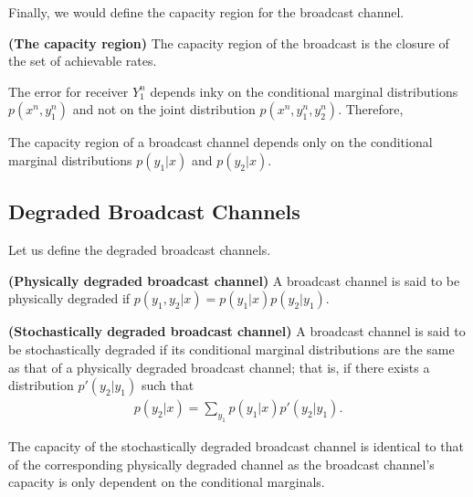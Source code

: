%
Finally, we would define the capacity region for the broadcast channel.
%
\begin{tcolorbox}[boxrule=0pt,frame hidden,sharp corners,enhanced, opacityback=0, borderline west={2pt}{0pt}{red}]
\begin{defn} \textbf{(The capacity region)} The capacity region of the broadcast is the closure of the set of achievable rates.
\end{defn}
\end{tcolorbox}
%
The error for receiver $Y_1^n$ depends inky on the conditional marginal distributions $p(x^n, y_1^n)$ and not on the joint distribution $p(x^n, y_1^n, y_2^n)$. Therefore,
%
\begin{tcolorbox}[boxrule=0pt,frame hidden,sharp corners,enhanced, opacityback=0, borderline west={2pt}{0pt}{blue}]
\begin{thm} 
The capacity region of a broadcast channel depends only on the conditional marginal distributions $p(y_1|x)$ and $p(y_2|x)$.
%
\end{thm}
\end{tcolorbox}
%
\subsection{Degraded Broadcast Channels}
Let us define the degraded broadcast channels.
%
\begin{tcolorbox}[boxrule=0pt,frame hidden,sharp corners,enhanced, opacityback=0, borderline west={2pt}{0pt}{red}]
\begin{defn} \textbf{(Physically degraded broadcast channel)} A broadcast channel is said to be physically degraded if $p(y_1,y_2|x) = p(y_1|x)p(y_2|y_1)$.
\end{defn}
\end{tcolorbox}
%
%
\begin{tcolorbox}[boxrule=0pt,frame hidden,sharp corners,enhanced, opacityback=0, borderline west={2pt}{0pt}{red}]
\begin{defn} \textbf{(Stochastically degraded broadcast channel)} A broadcast channel is said to be stochastically degraded if its conditional marginal distributions are the same as that of a physically degraded broadcast channel; that is, if there exists a distribution $p'(y_2|y_1)$ such that 
%
\begin{eqnarray}
    p(y_2|x) = \sum_{y_1} p(y_1|x)p'(y_2|y_1).
\end{eqnarray}
%
\end{defn}
\end{tcolorbox}
%
The capacity of the stochastically degraded broadcast channel is identical to that of the corresponding physically degraded channel as the broadcast channel's capacity is only dependent on the conditional marginals.

